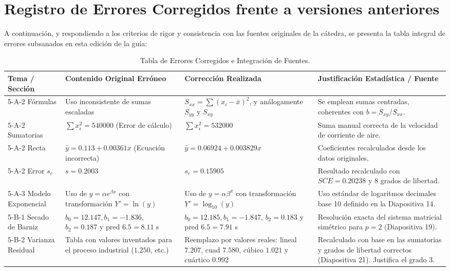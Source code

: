 \documentclass[11pt,letterpaper]{article}
\begin{document}
\newpage

\section{Registro de Errores Corregidos frente a versiones anteriores}
A continuación, y respondiendo a los criterios de rigor y consistencia con las fuentes originales de la cátedra, se presenta la tabla integral de errores subsanados en esta edición de la guía:

\begin{table}[htbp]
    \centering
    \fontsize{8.5}{11.5}\selectfont
    \begin{tabular}{lp{3.5cm}p{4.2cm}p{4cm}}
        \toprule
        \textbf{Tema / Sección} & \textbf{Contenido Original Erróneo} & \textbf{Corrección Realizada} & \textbf{Justificación Estadística / Fuente} \\
        \midrule
        5-A-2 Fórmulas & Uso inconsistente de sumas escaladas & $S_{xx}=\sum(x_i-\bar{x})^2$, y análogamente $S_{yy}$ y $S_{xy}$ & Se emplean sumas centradas, coherentes con $b=S_{xy}/S_{xx}$. \\
        \midrule
        5-A-2 Sumatorias & $\sum x_i^2 = 540000$ (Error de cálculo) & $\sum x_i^2 = 532000$ & Suma manual correcta de la velocidad de corriente de aire. \\
        \midrule
        5-A-2 Recta & $\hat{y} = 0.113 + 0.00361x$ (Ecuación incorrecta) & $\hat{y} = 0.06924 + 0.003829x$ & Coeficientes recalculados desde los datos originales. \\
        \midrule
        5-A-2 Error $s_e$ & $s = 0.2003$ & $s_e = 0.15905$ & Resultado recalculado con $SCE=0.20238$ y $8$ grados de libertad. \\
        \midrule
        5-A-3 Modelo Exponencial & Uso de $y = \alpha e^{\beta x}$ con transformación $Y' = \ln(y)$ & Uso de $y = \alpha \beta^x$ con transformación $Y' = \log_{10}(y)$ & Uso estándar de logaritmos decimales base 10 definido en la Diapositiva 14. \\
        \midrule
        5-B-1 Secado de Barniz & $b_0 = 12.147, b_1 = -1.836$, $b_2 = 0.187$ y pred $6.5 = 8.11$ s & $b_0 = 12.185, b_1 = -1.847$, $b_2 = 0.183$ y pred $6.5 = 7.91$ s & Resolución exacta del sistema matricial simétrico para $p=2$ (Diapositiva 19). \\
        \midrule
        5-B-2 Varianza Residual & Tabla con valores inventados para el proceso industrial ($1.250$, etc.) & Reemplazo por valores reales: lineal $7.207$, cuad $7.580$, cúbico $1.021$ y cuártico $0.992$ & Recalculado con base en las sumatorias y grados de libertad correctos (Diapositiva 21). Justifica el grado 3. \\
        \bottomrule
    \end{tabular}
    \caption{Tabla de Errores Corregidos e Integración de Fuentes.}
    \label{tab:errores_corregidos}
\end{table}
\end{document}
